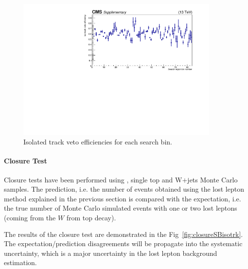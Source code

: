 \begin{figure}[htbp]
\begin{center}
\includegraphics[width=0.9\textwidth]{sections/mc4/Backgrounds/LostLepton/figures/v2_isotrackvetoEff.pdf}%
\end{center}
\caption{Isolated track veto efficiencies for each search bin.}
\label{fig:isotrackeff}
\end{figure}

\paragraph{Closure Test}
Closure tests have been performed using \ttbar, single top and W$+$jets Monte Carlo samples. The prediction, i.e. the number of events obtained using the lost lepton 
method explained in the previous section is compared with the expectation, i.e. the true number of Monte Carlo simulated events with one or two lost leptons (coming from the $W$ from top decay). 

The results of the closure test are demonstrated in the Fig~\ref{fig:closureSBisotrk}. The expectation/prediction disagreements will be propagate into the systematic uncertainty, which is a major uncertainty in the lost lepton background estimation.

